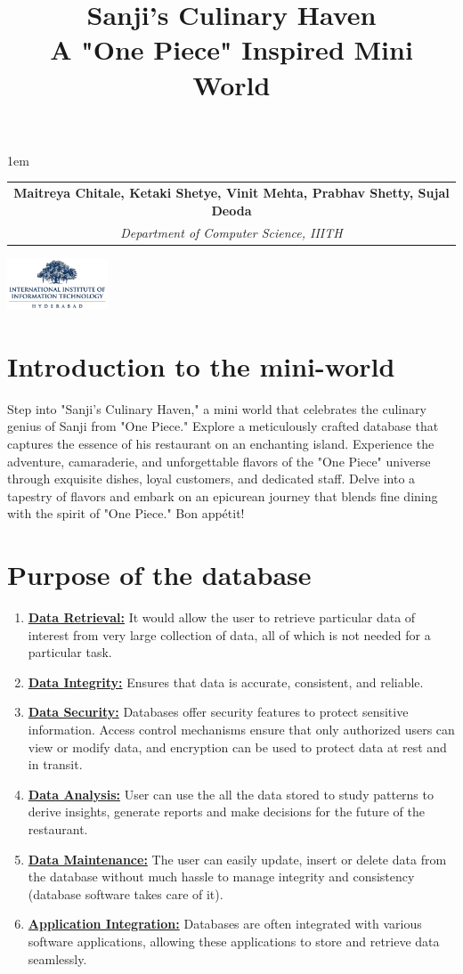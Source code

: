 \documentclass{article}
\title{Sanji's Culinary Haven \\ A "One Piece" Inspired Mini World}
\makeatletter
\renewcommand{\maketitle}{
  \begin{center}
    {\LARGE\textbf{\@title}}\par
    \vspace{1em}
    \large
    \lineskip 1em
    \begin{tabular}[t]{c}
      \textbf{\large Maitreya Chitale, Ketaki Shetye, Vinit Mehta, Prabhav Shetty, Sujal Deoda} \\
      \textit{Department of Computer Science, IIITH} \\
    \end{tabular}\par
  \end{center}
}
\makeatother
\begin{document}
\maketitle

\begin{center}
    \includegraphics[width=3cm]{IIITH.png} 
\end{center}

\section{Introduction to the mini-world}
Step into "Sanji's Culinary Haven," a mini world that celebrates the culinary genius of Sanji from "One Piece." Explore a meticulously crafted database that captures the essence of his restaurant on an enchanting island. Experience the adventure, camaraderie, and unforgettable flavors of the "One Piece" universe through exquisite dishes, loyal customers, and dedicated staff. Delve into a tapestry of flavors and embark on an epicurean journey that blends fine dining with the spirit of "One Piece." Bon appétit!

\section{Purpose of the database}
\begin{enumerate}
    \item \underline{\textbf{Data Retrieval:}} It would allow the user to retrieve particular data of interest from very large collection of data, all of which is not needed for a particular task.
    \item \underline{\textbf{Data Integrity:}} Ensures that data is accurate, consistent, and reliable.
    \item \underline{\textbf{Data Security:}} Databases offer security features to protect sensitive information. Access control mechanisms ensure that only authorized users can view or modify data, and encryption can be used to protect data at rest and in transit.
    \item \underline{\textbf{Data Analysis:}} User can use the all the data stored to study patterns to derive insights, generate reports and make decisions for the future of the restaurant.
    \item \underline{\textbf{Data Maintenance:}} The user can easily update, insert or delete data from the database without much hassle to manage integrity and consistency (database software takes care of it).
    \item \underline{\textbf{Application Integration:}} Databases are often integrated with various software applications, allowing these applications to store and retrieve data seamlessly.
\end{enumerate}
\end{document}
